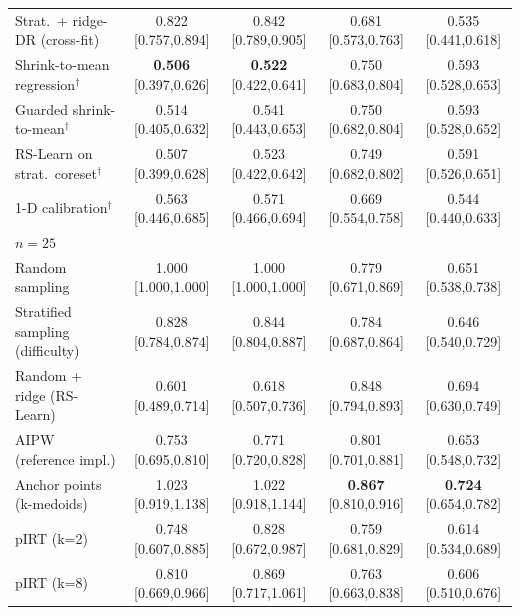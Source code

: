 \begin{tabular}{l cccc}
Strat.\ + ridge-DR (cross-fit) & 0.822 {\scriptsize[0.757,0.894]} & 0.842 {\scriptsize[0.789,0.905]} & 0.681 {\scriptsize[0.573,0.763]} & 0.535 {\scriptsize[0.441,0.618]} \\
Shrink-to-mean regression$^\dagger$ & \textbf{0.506} {\scriptsize[0.397,0.626]} & \textbf{0.522} {\scriptsize[0.422,0.641]} & 0.750 {\scriptsize[0.683,0.804]} & 0.593 {\scriptsize[0.528,0.653]} \\
Guarded shrink-to-mean$^\dagger$ & 0.514 {\scriptsize[0.405,0.632]} & 0.541 {\scriptsize[0.443,0.653]} & 0.750 {\scriptsize[0.682,0.804]} & 0.593 {\scriptsize[0.528,0.652]} \\
RS-Learn on strat.\ coreset$^\dagger$ & 0.507 {\scriptsize[0.399,0.628]} & 0.523 {\scriptsize[0.422,0.642]} & 0.749 {\scriptsize[0.682,0.802]} & 0.591 {\scriptsize[0.526,0.651]} \\
1-D calibration$^\dagger$ & 0.563 {\scriptsize[0.446,0.685]} & 0.571 {\scriptsize[0.466,0.694]} & 0.669 {\scriptsize[0.554,0.758]} & 0.544 {\scriptsize[0.440,0.633]} \\
\midrule
\multicolumn{5}{l}{\emph{$n=25$}}\\
Random sampling & 1.000 {\scriptsize[1.000,1.000]} & 1.000 {\scriptsize[1.000,1.000]} & 0.779 {\scriptsize[0.671,0.869]} & 0.651 {\scriptsize[0.538,0.738]} \\
Stratified sampling (difficulty) & 0.828 {\scriptsize[0.784,0.874]} & 0.844 {\scriptsize[0.804,0.887]} & 0.784 {\scriptsize[0.687,0.864]} & 0.646 {\scriptsize[0.540,0.729]} \\
Random + ridge (RS-Learn) & 0.601 {\scriptsize[0.489,0.714]} & 0.618 {\scriptsize[0.507,0.736]} & 0.848 {\scriptsize[0.794,0.893]} & 0.694 {\scriptsize[0.630,0.749]} \\
AIPW (reference impl.) & 0.753 {\scriptsize[0.695,0.810]} & 0.771 {\scriptsize[0.720,0.828]} & 0.801 {\scriptsize[0.701,0.881]} & 0.653 {\scriptsize[0.548,0.732]} \\
Anchor points (k-medoids) & 1.023 {\scriptsize[0.919,1.138]} & 1.022 {\scriptsize[0.918,1.144]} & \textbf{0.867} {\scriptsize[0.810,0.916]} & \textbf{0.724} {\scriptsize[0.654,0.782]} \\
pIRT (k=2) & 0.748 {\scriptsize[0.607,0.885]} & 0.828 {\scriptsize[0.672,0.987]} & 0.759 {\scriptsize[0.681,0.829]} & 0.614 {\scriptsize[0.534,0.689]} \\
pIRT (k=8) & 0.810 {\scriptsize[0.669,0.966]} & 0.869 {\scriptsize[0.717,1.061]} & 0.763 {\scriptsize[0.663,0.838]} & 0.606 {\scriptsize[0.510,0.676]} \\

\end{tabular}
